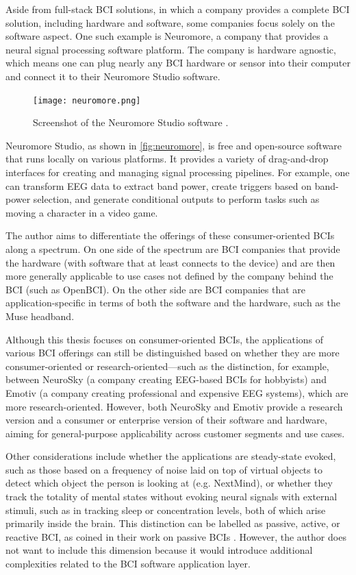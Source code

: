 Aside from full-stack BCI solutions, in which a company provides a complete BCI solution, including hardware and software, some companies focus solely on the software aspect. One such example is Neuromore, a company that provides a neural signal processing software platform. The company is hardware agnostic, which means one can plug nearly any BCI hardware or sensor into their computer and connect it to their Neuromore Studio software.

\begin{figure}[ht]
  \centering
  \texttt{[image: neuromore.png]}
  \caption[Screenshot of the Neuromore Studio software.]{Screenshot of the Neuromore Studio software \citep{neuromore_neuromore_nodate}.}
  \label{fig:neuromore}
\end{figure}

Neuromore Studio, as shown in \autoref{fig:neuromore}, is free and open-source software that runs locally on various platforms. It provides a variety of drag-and-drop interfaces for creating and managing signal processing pipelines. For example, one can transform EEG data to extract band power, create triggers based on band-power selection, and generate conditional outputs to perform tasks such as moving a character in a video game.

The author aims to differentiate the offerings of these consumer-oriented BCIs along a spectrum. On one side of the spectrum are BCI companies that provide the hardware (with software that at least connects to the device) and are then more generally applicable to use cases not defined by the company behind the BCI (such as OpenBCI). On the other side are BCI companies that are application-specific in terms of both the software and the hardware, such as the Muse headband.

Although this thesis focuses on consumer-oriented BCIs, the applications of various BCI offerings can still be distinguished based on whether they are more consumer-oriented or research-oriented—such as the distinction, for example, between NeuroSky (a company creating EEG-based BCIs for hobbyists) and Emotiv (a company creating professional and expensive EEG systems), which are more research-oriented. However, both NeuroSky and Emotiv provide a research version and a consumer or enterprise version of their software and hardware, aiming for general-purpose applicability across customer segments and use cases.

Other considerations include whether the applications are steady-state evoked, such as those based on a frequency of noise laid on top of virtual objects to detect which object the person is looking at (e.g. NextMind), or whether they track the totality of mental states without evoking neural signals with external stimuli, such as in tracking sleep or concentration levels, both of which arise primarily inside the brain. This distinction can be labelled as passive, active, or reactive BCI, as \citeauthor{alimardani_passive_2020} coined in their work on passive BCIs \citep{alimardani_passive_2020}. However, the author does not want to include this dimension because it would introduce additional complexities related to the BCI software application layer.

